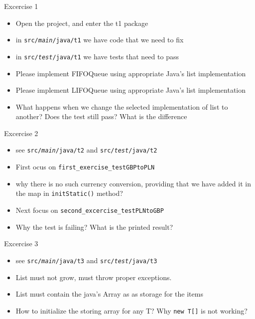 \documentclass{beamer}
\begin{document}
\begin{frame}{Excercise 1}

\begin{itemize}
	\item Open the project, and enter the t1 package
    \item in \texttt{src/\textit{main}/java/t1} we have code that we need to fix
    \item in \texttt{src/\textit{test}/java/t1} we have tests that need to pass
    \item Please implement FIFOQueue using appropriate Java's list implementation
    \item Please implement LIFOQueue using appropriate Java's list implementation
    \item What happens when we change the selected implementation of list to another? Does the test still pass? What is the difference
\end{itemize}
\end{frame}

\begin{frame}{Excercise 2}

\begin{itemize}
    \item see \texttt{src/\textit{main}/java/t2} and \texttt{src/\textit{test}/java/t2}
    \item First ocus on \texttt{first\_exercise\_testGBPtoPLN}
    \item why there is no such currency conversion, providing that we have added it in the map in \texttt{initStatic()} method?
    \item Next focus on \texttt{second\_excercise\_testPLNtoGBP}
    \item Why the test is failing? What is the printed result?
\end{itemize}
\end{frame}

\begin{frame}{Excercise 3}

\begin{itemize}
    \item see \texttt{src/\textit{main}/java/t3} and \texttt{src/\textit{test}/java/t3}
    \item List must not grow, must throw proper exceptions.
    \item List must contain the java's Array as as storage for the items
    \item How to initialize the storing array for any T? Why \texttt{new T[]} is not working?
\end{itemize}
\end{frame}
\end{document}
